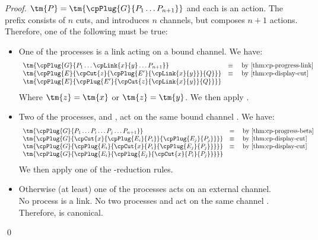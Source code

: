 \documentclass[UKenglish]{llncs}
\begin{document}
\begin{subappendices}
\begin{proof}
    $\tm{P} = \tm{\cpPlug{G}{P_1 \dots P_{n+1}}}$ and each  is an
    action. The prefix  consists of $n$ cuts, and introduces $n$ channels,
    but composes $n+1$ actions. Therefore, one of the following must be true: 
    \begin{itemize}
    \item
      One of the processes is a link  acting on a bound
      channel. We have: 
      \begin{gather*}
        \begin{array}{ll}
          \tm{\cpPlug{G}{P_1 \dots \cpLink{x}{y} \dots P_{n+1}}}
          & \equiv \quad \text{by \cref{thm:cp-progress-link}}
          \\
          \tm{\cpPlug{E}{\cpCut{z}{\cpPlug{E'}{\cpLink{x}{y}}}{Q}}}
          & \equiv \quad \text{by \cref{thm:cp-display-cut}}
          \\
          \tm{\cpPlug{E}{\cpPlug{E'}{\cpCut{z}{\cpLink{x}{y}}{Q}}}}
        \end{array}
      \end{gather*}
      Where $\tm{z} = \tm{x}$ or $\tm{z} = \tm{y}$.
      We then apply .
    \item
      Two of the processes,  and , act on the same bound channel
      . We have:
      \begin{gather*}
        \begin{array}{ll}
          \tm{\cpPlug{G}{P_1 \dots P_i \dots P_j \dots P_{n+1}}}
          & = \quad \text{by \cref{thm:cp-progress-beta}}
          \\
          \tm{\cpPlug{G}{\cpCut{x}{\cpPlug{E_i}{P_i}}{\cpPlug{E_j}{P_j}}}}
          & \equiv \quad \text{by \cref{thm:cp-display-cut}} 
          \\
          \tm{\cpPlug{G}{\cpPlug{E_i}{\cpCut{x}{P_i}{\cpPlug{E_j}{P_j}}}}}
          & \equiv \quad \text{by \cref{thm:cp-display-cut}} 
          \\
          \tm{\cpPlug{G}{\cpPlug{E_i}{\cpPlug{E_j}{\cpCut{x}{P_i}{P_j}}}}} 
        \end{array}
      \end{gather*}
      We then apply one of the \textbeta-reduction rules.
    \item
      Otherwise (at least) one of the processes acts on an external channel.
      \\
      No process  is a link.
      No two processes  and  act on the same channel .
      Therefore,  is canonical.
    \end{itemize}
    \qed
  \end{proof}


\end{subappendices}
\end{document}
